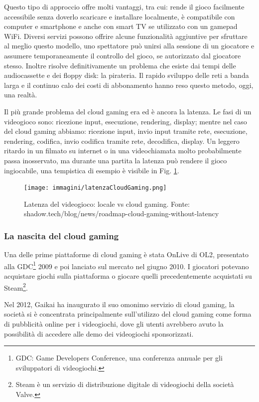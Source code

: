 Questo tipo di approccio offre molti vantaggi, tra cui: rende il gioco facilmente accessibile senza doverlo scaricare e installare localmente, è compatibile con computer e smartphone e anche con smart TV se utilizzato con un gamepad WiFi. Diversi servizi possono offrire alcune funzionalità aggiuntive per sfruttare al meglio questo modello, uno spettatore può unirsi alla sessione di un giocatore e assumere temporaneamente il controllo del gioco, se autorizzato dal giocatore stesso. Inoltre risolve definitivamente un problema che esiste dai tempi delle audiocassette e dei floppy disk: la pirateria. Il rapido sviluppo delle reti a banda larga e il continuo calo dei costi di abbonamento hanno reso questo metodo, oggi, una realtà.

Il più grande problema del cloud gaming era ed è ancora la latenza. Le fasi di un videogioco sono: ricezione input, esecuzione, rendering, display; mentre nel caso del cloud gaming abbiamo: ricezione input, invio input tramite rete, esecuzione, rendering, codifica, invio codifica tramite rete, decodifica, display. Un leggero ritardo in un filmato su internet o in una videochiamata molto probabilmente passa inosservato, ma durante una partita la latenza può rendere il gioco ingiocabile, una tempistica di esempio è visibile in Fig. \ref{fig:latenzaCloudGaming}.

\begin{figure}[H]
	\texttt{[image: immagini/latenzaCloudGaming.png]}
	\caption{Latenza del videogioco: locale vs cloud gaming. Fonte: shadow.tech/blog/news/roadmap-cloud-gaming-without-latency}
	\label{fig:latenzaCloudGaming}
\end{figure}

\subsubsection{La nascita del cloud gaming}
Una delle prime piattaforme di cloud gaming è stata OnLive di OL2, presentato alla GDC\footnote{GDC: Game Developers Conference, una conferenza annuale per gli sviluppatori di videogiochi.} 2009 e poi lanciato sul mercato nel giugno 2010. I giocatori potevano acquistare giochi sulla piattaforma o giocare quelli precedentemente acquistati su Steam\footnote{Steam è un servizio di distribuzione digitale di videogiochi della società Valve.}.

Nel 2012, Gaikai ha inaugurato il suo omonimo servizio di cloud gaming, la società si è concentrata principalmente sull'utilizzo del cloud gaming come forma di pubblicità online per i videogiochi, dove gli utenti avrebbero avuto la possibilità di accedere alle demo dei videogiochi sponsorizzati.


